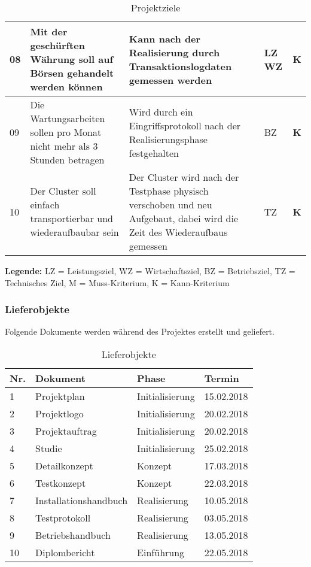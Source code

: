 \begin{table}[H]
\begin{tabular}[t]{p{0.7cm}|p{6.1cm}p{6.1cm} >{\centering}p{0.6cm}c}
08 & Mit der geschürften Währung soll auf Börsen gehandelt werden können & Kann nach der Realisierung durch Transaktionslogdaten gemessen werden & LZ \newline WZ & \textbf{K} \\\hline
09 & Die Wartungsarbeiten sollen pro Monat nicht mehr als 3 Stunden betragen & Wird durch ein Eingriffsprotokoll nach der Realisierungsphase festgehalten & BZ & \textbf{K} \\\hline
10 & Der Cluster soll einfach transportierbar und wiederaufbaubar sein & Der Cluster wird nach der Testphase physisch verschoben und neu Aufgebaut, dabei wird die Zeit des Wiederaufbaus gemessen & TZ & \textbf{K}\\\hline
\end{tabular}
\caption{Projektziele}
\end{table}

\textbf{Legende:} LZ = Leistungsziel, WZ = Wirtschaftsziel, BZ = Betriebsziel, TZ = Technisches Ziel, \newline M = Muss-Kriterium, K = Kann-Kriterium

\subsubsection{Lieferobjekte}
Folgende Dokumente werden während des Projektes erstellt und geliefert.

\begin{table}[H]
\begin{tabular}[t]{p{0.5cm}p{6.5cm}p{6.5cm}p{1.8cm}}
\hline
\rowcolor{heading}\textbf{Nr.} & \textbf{Dokument} & \textbf{Phase} & \textbf{Termin} \\\hline
1 & Projektplan & Initialisierung & 15.02.2018 \\\hline
2 & Projektlogo & Initialisierung & 20.02.2018 \\\hline
3 & Projektauftrag & Initialisierung & 20.02.2018 \\\hline
4 & Studie & Initialisierung & 25.02.2018 \\\hline
5 & Detailkonzept & Konzept & 17.03.2018 \\\hline
6 & Testkonzept & Konzept & 22.03.2018 \\\hline
7 & Installationshandbuch & Realisierung & 10.05.2018 \\\hline
8 & Testprotokoll & Realisierung & 03.05.2018 \\\hline
9 & Betriebshandbuch & Realisierung & 13.05.2018 \\\hline
10 & Diplombericht & Einführung & 22.05.2018 \\\hline

\end{tabular}
\caption{Lieferobjekte}
\end{table}


 

